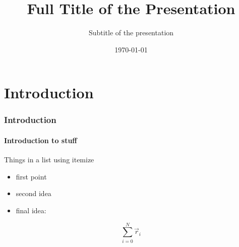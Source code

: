 \documentclass[english]{beamer}
\author[\myname]{\myname}
\title[Short Title]{Full Title of the Presentation}
\subtitle{Subtitle of the presentation}
\date{\today}
\institute[IoS]{\myinstitute}
\begin{document}
\maketitle
\maketableofcontents

\section{Introduction}
\begin{frame}
    \frametitle{Introduction}
    \framesubtitle{Introduction to stuff}
    Things in a list using itemize
    \begin{itemize}
    \item first point
    \item second idea
    \item final idea:
    \end{itemize}

    $$\sum^{N}_{i=0} \vec{r}_{i}$$
\end{frame}
\end{document}
